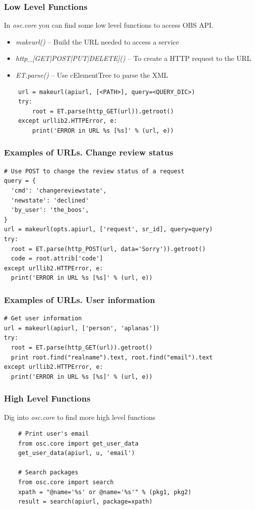 \documentclass{beamer}
\begin{document}
\begin{frame}[fragile]
  \frametitle{Low Level Functions}
  In {\em osc.core} you can find some low level functions to access OBS API. 
  \begin{itemize}
  \item {\em makeurl()} -- Build the URL needed to access a service
  \item {\em http\_[GET|POST|PUT|DELETE]()} -- To create a HTTP request to the URL
  \item {\em ET.parse()} -- Use cElementTree to parse the XML
  \end{itemize}
  \lstset{style=mypython}
  \begin{lstlisting}
    url = makeurl(apiurl, [<PATH>], query=<QUERY_DIC>)
    try:
        root = ET.parse(http_GET(url)).getroot()
    except urllib2.HTTPError, e:
        print('ERROR in URL %s [%s]' % (url, e))
  \end{lstlisting}
\end{frame}

\begin{frame}[fragile]
  \frametitle{Examples of URLs. Change review status}
  \lstset{style=mypython}
  \begin{lstlisting}
# Use POST to change the review status of a request
query = {
  'cmd': 'changereviewstate',
  'newstate': 'declined'
  'by_user': 'the_boos',
}
url = makeurl(opts.apiurl, ['request', sr_id], query=query)
try:
  root = ET.parse(http_POST(url, data='Sorry')).getroot()
  code = root.attrib['code']
except urllib2.HTTPError, e:
  print('ERROR in URL %s [%s]' % (url, e))
  \end{lstlisting}
\end{frame}

\begin{frame}[fragile]
  \frametitle{Examples of URLs. User information}
  \lstset{style=mypython}
  \begin{lstlisting}
# Get user information
url = makeurl(apiurl, ['person', 'aplanas'])
try:
  root = ET.parse(http_GET(url)).getroot()
  print root.find("realname").text, root.find("email").text
except urllib2.HTTPError, e:
  print('ERROR in URL %s [%s]' % (url, e))
  \end{lstlisting}
\end{frame}

\begin{frame}[fragile]
  \frametitle{High Level Functions}
  Dig into {\em osc.core} to find more high level functions
  \begin{lstlisting}
    # Print user's email
    from osc.core import get_user_data
    get_user_data(apiurl, u, 'email')

    # Search packages
    from osc.core import search
    xpath = "@name='%s' or @name='%s'" % (pkg1, pkg2)
    result = search(apiurl, package=xpath)
  \end{lstlisting}
\end{frame}
\end{document}
